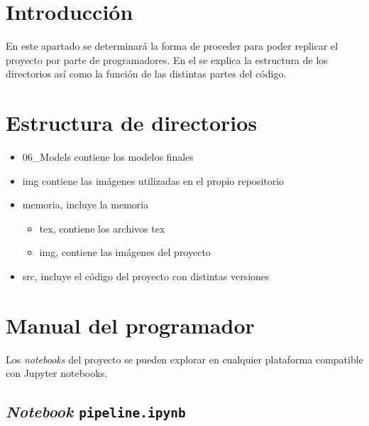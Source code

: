 
\section{Introducción}

En este apartado se determinará la forma de proceder para poder replicar el proyecto por parte de programadores. En el se explica la estructura de los directorios así como la función de las distintas partes del código.

\section{Estructura de directorios}

\begin{itemize}
    \item 06\_Models contiene los modelos finales
    \item img contiene las imágenes utilizadas en el propio repositorio
    \item memoria, incluye la memoria
    \begin{itemize}
        \item tex, contiene los archivos tex
        \item img, contiene las imágenes del proyecto
    \end{itemize}
        \item src, incluye el código del proyecto con distintas versiones
\end{itemize}

\section{Manual del programador}


Los \textit{notebooks} del proyecto se pueden explorar en cualquier plataforma compatible con Jupyter notebooks.

\subsection{\textit{Notebook} \texttt{pipeline.ipynb}} \label{anx:pipeline}

